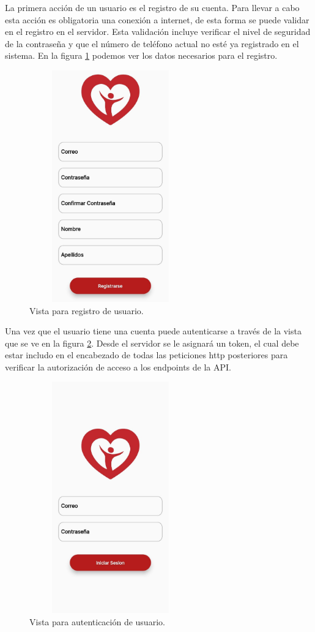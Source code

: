 La primera acción de un usuario es el registro de su cuenta. Para llevar a cabo esta acción es obligatoria una conexión a internet, de esta forma se puede validar en el registro en el servidor. Esta validación incluye verificar el nivel de seguridad de la contraseña y que el número de teléfono actual no esté ya registrado en el sistema. En la figura \ref{fig:signup_view} podemos ver los datos necesarios para el registro.
\begin{figure}[H]
	\centering
	\includegraphics[width=7cm, height=10cm]{Graphics/signup_view.jpg}
	\caption{Vista para registro de usuario.}
	\label{fig:signup_view}
\end{figure}
Una vez que el usuario tiene una cuenta puede autenticarse a través de la vista que se ve en la figura \ref{fig:auth_view}. Desde el servidor se le asignará un token, el cual debe estar includo en el encabezado de todas las peticiones http posteriores para verificar la autorización de acceso a los endpoints de la API.
\begin{figure}[H]
	\centering
	\includegraphics[width=7cm, height=10cm]{Graphics/auth_view.jpg}
	\caption{Vista para autenticación de usuario.}
	\label{fig:auth_view}
\end{figure}

